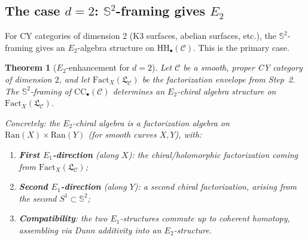 \documentclass[11pt]{article}
\theoremstyle{plain}
\newtheorem{theorem}{Theorem}[section]
\theoremstyle{definition}
\theoremstyle{remark}
\newcommand{\Eone}{E_1}
\newcommand{\Etwo}{E_2}
\newcommand{\HH}{\mathrm{HH}}
\newcommand{\Ran}{\mathrm{Ran}}
\newcommand{\Fact}{\mathrm{Fact}}
\newcommand{\cC}{\mathcal{C}}
\newcommand{\frakL}{\mathfrak{L}}
\begin{document}
\subsection{The case $d = 2$: $\mathbb{S}^2$-framing gives $\Etwo$}
\label{sec:d2-case}

For CY categories of dimension 2 (K3 surfaces, abelian surfaces, etc.), the $\mathbb{S}^2$-framing gives an $\Etwo$-algebra structure on $\HH_\bullet(\cC)$. This is the primary case.

\begin{theorem}[$\Etwo$-enhancement for $d = 2$]
\label{thm:e2-enhancement-d2}
Let $\cC$ be a smooth, proper CY category of dimension $2$, and let $\Fact_X(\frakL_\cC)$ be the factorization envelope from Step~2. The $\mathbb{S}^2$-framing of $\mathrm{CC}_\bullet(\cC)$ determines an $\Etwo$-chiral algebra structure on $\Fact_X(\frakL_\cC)$.

Concretely: the $\Etwo$-chiral algebra is a factorization algebra on $\Ran(X) \times \Ran(Y)$ (for smooth curves $X, Y$), with:
\begin{enumerate}[label=(\roman*)]
\item \textbf{First $\Eone$-direction} (along $X$): the chiral/holomorphic factorization coming from $\Fact_X(\frakL_\cC)$;
\item \textbf{Second $\Eone$-direction} (along $Y$): a second chiral factorization, arising from the second $S^1 \subset \mathbb{S}^2$;
\item \textbf{Compatibility}: the two $\Eone$-structures commute up to coherent homotopy, assembling via Dunn additivity into an $\Etwo$-structure.
\end{enumerate}
\end{theorem}
\end{document}
